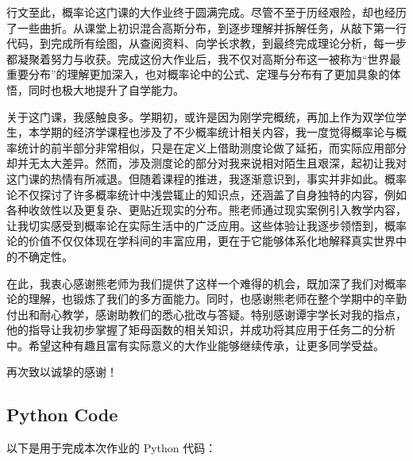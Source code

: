 \documentclass{article}
\begin{document}
行文至此，概率论这门课的大作业终于圆满完成。尽管不至于历经艰险，却也经历了一些曲折。从课堂上初识混合高斯分布，到逐步理解并拆解任务，从敲下第一行代码，到完成所有绘图，从查阅资料、向学长求教，到最终完成理论分析，每一步都凝聚着努力与收获。完成这份大作业后，我不仅对高斯分布这一被称为“世界最重要分布”的理解更加深入，也对概率论中的公式、定理与分布有了更加具象的体悟，同时也极大地提升了自学能力。

关于这门课，我感触良多。学期初，或许是因为刚学完概统，再加上作为双学位学生，本学期的经济学课程也涉及了不少概率统计相关内容，我一度觉得概率论与概率统计的前半部分非常相似，只是在定义上借助测度论做了延拓，而实际应用部分却并无太大差异。然而，涉及测度论的部分对我来说相对陌生且艰深，起初让我对这门课的热情有所减退。但随着课程的推进，我逐渐意识到，事实并非如此。概率论不仅探讨了许多概率统计中浅尝辄止的知识点，还涵盖了自身独特的内容，例如各种收敛性以及更复杂、更贴近现实的分布。熊老师通过现实案例引入教学内容，让我切实感受到概率论在实际生活中的广泛应用。这些体验让我逐步领悟到，概率论的价值不仅仅体现在学科间的丰富应用，更在于它能够体系化地解释真实世界中的不确定性。

在此，我衷心感谢熊老师为我们提供了这样一个难得的机会，既加深了我们对概率论的理解，也锻炼了我们的多方面能力。同时，也感谢熊老师在整个学期中的辛勤付出和耐心教学，感谢助教们的悉心批改与答疑。特别感谢谭宇学长对我的指点，他的指导让我初步掌握了矩母函数的相关知识，并成功将其应用于任务二的分析中。希望这种有趣且富有实际意义的大作业能够继续传承，让更多同学受益。

再次致以诚挚的感谢！

\newpage

\begin{appendices}
\section{Python Code}
以下是用于完成本次作业的 Python 代码：



\newpage



\end{appendices}
\end{document}
